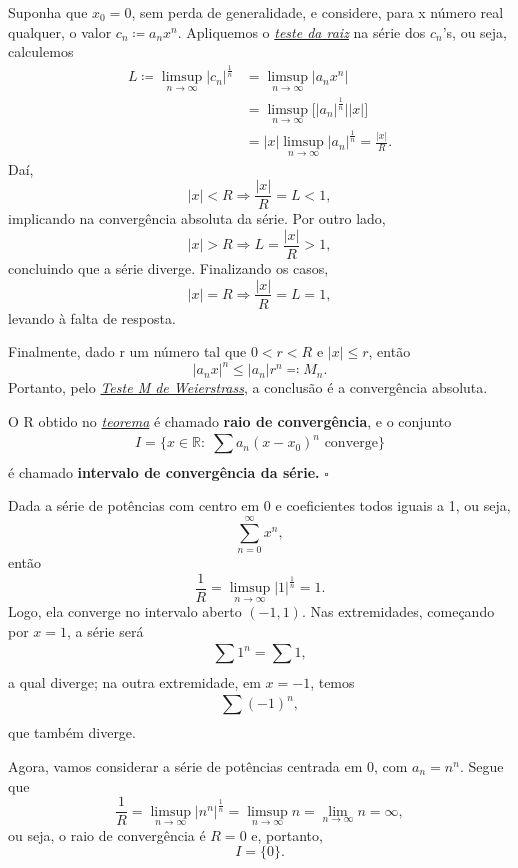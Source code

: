 \documentclass[../analysisII_notes.tex]{subfiles}
\begin{document}
\begin{proof*}
	Suponha que \(x_{0} = 0\), sem perda de generalidade, e considere, para x número real qualquer, o valor \(c_{n}\coloneqq a_{n}x^{n}\). Apliquemos o \hyperlink{root_test}{\textit{teste da raiz}} na série dos \(c_{n}\)'s, ou seja, calculemos
	\begin{align*}
		L\coloneqq \limsup_{n\to \infty}|c_{n}|^{\frac{1}{n}} & = \limsup_{n\to \infty}|a_{n}x^{n}|                              \\
		                                                      & = \limsup_{n\to \infty}\biggl[|a_{n}|^{\frac{1}{n}}||x|\biggr]   \\
		                                                      & = |x|\limsup_{n\to \infty}|a_{n}|^{\frac{1}{n}} = \frac{|x|}{R}.
	\end{align*}
	Daí,
	\[
		|x|<R \Rightarrow \frac{|x|}{R} = L < 1,
	\]
	implicando na convergência absoluta da série. Por outro lado,
	\[
		|x|>R \Rightarrow L = \frac{|x|}{R} > 1,
	\]
	concluindo que a série diverge. Finalizando os casos,
	\[
		|x| = R \Rightarrow \frac{|x|}{R} = L = 1,
	\]
	levando à falta de resposta.

	Finalmente, dado r um número tal que \(0 < r < R\) e \(|x| \leq r\), então
	\[
		|a_{n}x|^{n} \leq |a_{n}|r^{n}\eqqcolon M_{n}.
	\]
	Portanto, pelo \hyperlink{weierstrass_m}{\textit{Teste M de Weierstrass}}, a conclusão é a convergência absoluta. \qedsymbol
\end{proof*}
\begin{def*}
	O R obtido no \hyperlink{convergence_radius}{\textit{teorema}} é chamado \textbf{raio de convergência}, e o conjunto
	\[
		I = \{x\in \mathbb{R}:\; \sum\limits_{}^{}a_{n}(x-x_{0})^{n}\text{ converge}\}
	\]
	é chamado \textbf{intervalo de convergência da série.} \(\square\)
\end{def*}
\begin{example}
	Dada a série de potências com centro em 0 e coeficientes todos iguais a 1, ou seja,
	\[
		\sum\limits_{n=0}^{\infty}x^{n},
	\]
	então
	\[
		\frac{1}{R} = \limsup_{n\to \infty}|1|^{\frac{1}{n}} = 1.
	\]
	Logo, ela converge no intervalo aberto \((-1, 1)\). Nas extremidades, começando por \(x = 1\), a série será
	\[
		\sum\limits_{}^{}1^{n} = \sum\limits_{}^{}1,
	\]
	a qual diverge; na outra extremidade, em \(x=-1\), temos
	\[
		\sum\limits_{}^{}(-1)^{n},
	\]
	que também diverge.
\end{example}
\begin{example}
	Agora, vamos considerar a série de potências centrada em 0, com \(a_{n} = n^{n}\). Segue que
	\[
		\frac{1}{R} = \limsup_{n\to \infty}|n^{n}|^{\frac{1}{n}} = \limsup_{n\to \infty} n = \lim_{n\to \infty}n = \infty,
	\]
	ou seja, o raio de convergência é \(R = 0\) e, portanto,
	\[
		I = \{0\}.
	\]
\end{example}
\end{document}
